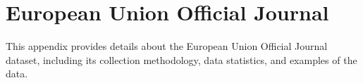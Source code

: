 \section{European Union Official Journal}
\label{appendix:eu_oj}

This appendix provides details about the European Union Official Journal dataset, including its collection methodology, data statistics, and examples of the data.


